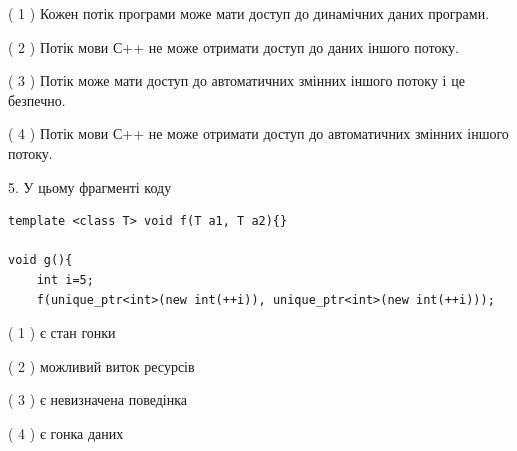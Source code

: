 \documentclass[12pt, ukrainian]{article}
\begin{document}
\begin {large}
{( 1 ) Кожен потік програми може мати доступ до динамічних даних програми.%

( 2 ) Потік мови С++ не може отримати доступ до даних іншого потоку.%

( 3 ) Потік може мати доступ до автоматичних змінних іншого потоку і це безпечно.%

( 4 ) Потік мови С++ не може отримати доступ до автоматичних змінних іншого потоку.%


5. У цьому фрагменті коду
\begin{verbatim}
template <class T> void f(T a1, T a2){}

void g(){
    int i=5;
    f(unique_ptr<int>(new int(++i)), unique_ptr<int>(new int(++i)));
\end{verbatim}

( 1 ) є стан гонки%

( 2 ) можливий виток ресурсів%

( 3 ) є невизначена поведінка%

( 4 ) є гонка даних%
}
\end {large}
\end{document}

